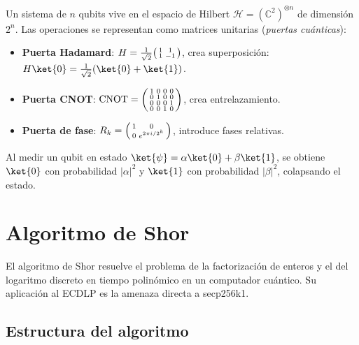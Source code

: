 Un sistema de $n$ qubits vive en el espacio de Hilbert $\mathcal{H} = (\mathbb{C}^2)^{\otimes n}$ de dimensión $2^n$. Las operaciones se representan como matrices unitarias (\emph{puertas cuánticas}):

\begin{itemize}
  \item \textbf{Puerta Hadamard}: $H = \frac{1}{\sqrt{2}} \begin{psmallmatrix} 1 & 1 \\ 1 & -1 \end{psmallmatrix}$, crea superposición: $H\ket{0} = \frac{1}{\sqrt{2}}(\ket{0} + \ket{1})$.
  
  \item \textbf{Puerta CNOT}: $\text{CNOT} = \begin{psmallmatrix} 1&0&0&0 \\ 0&1&0&0 \\ 0&0&0&1 \\ 0&0&1&0 \end{psmallmatrix}$, crea entrelazamiento.
  
  \item \textbf{Puerta de fase}: $R_k = \begin{psmallmatrix} 1 & 0 \\ 0 & e^{2\pi i / 2^k} \end{psmallmatrix}$, introduce fases relativas.
\end{itemize}

Al medir un qubit en estado $\ket{\psi} = \alpha\ket{0} + \beta\ket{1}$, se obtiene $\ket{0}$ con probabilidad $|\alpha|^2$ y $\ket{1}$ con probabilidad $|\beta|^2$, colapsando el estado.


\section{Algoritmo de Shor}
\label{sec:shor}

El algoritmo de Shor \parencite{shor1994algorithms} resuelve el problema de la factorización de enteros y el del logaritmo discreto en tiempo polinómico en un computador cuántico. Su aplicación al ECDLP es la amenaza directa a secp256k1.

\subsection{Estructura del algoritmo}

